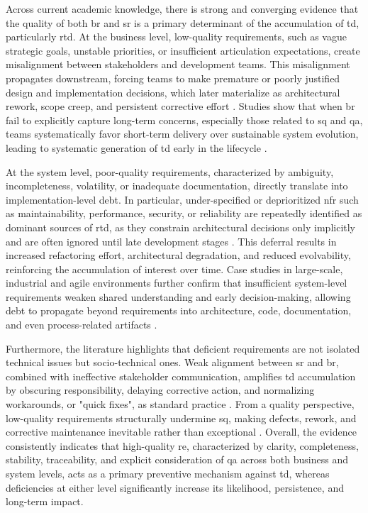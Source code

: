 \documentclass[12pt,reqno, twoside]{amsbook}
\theoremstyle{plain}
\numberwithin{equation}{chapter}
\numberwithin{section}{chapter}
\begin{document}
Across current academic knowledge, there is strong and converging evidence that the quality of both \gls{br} and \gls{sr}
is a primary determinant of the accumulation of \gls{td}, particularly \gls{rtd}. At the business level, low-quality requirements,
such as vague strategic goals, unstable priorities, or insufficient articulation expectations, create misalignment between stakeholders 
and development teams. This misalignment propagates downstream, forcing teams to make premature or poorly justified design and 
implementation decisions, which later materialize as architectural rework, scope creep, and persistent corrective effort \parencite{Rios2019,Besker2019}. 
Studies show that when \gls{br} fail to explicitly capture long-term concerns, especially those related to \gls{sq} and \gls{qa}, 
teams systematically favor short-term delivery over sustainable system evolution, leading to systematic generation of \gls{td} early 
in the lifecycle \parencite{Freire2020}.

At the system level, poor-quality requirements, characterized by ambiguity, incompleteness, volatility, or inadequate documentation,
directly translate into implementation-level debt. In particular, under-specified or deprioritized \gls{nfr} such as maintainability, 
performance, security, or reliability are repeatedly identified as dominant sources of \gls{rtd}, as they constrain architectural 
decisions only implicitly and are often ignored until late development stages \parencite{Melo2022,Rios2019}. This deferral results in 
increased refactoring effort, architectural degradation, and reduced evolvability, reinforcing the accumulation of interest over time. 
Case studies in large-scale, industrial and agile environments further confirm that insufficient system-level requirements weaken 
shared understanding and early decision-making, allowing debt to propagate beyond requirements into architecture, code, documentation, 
and even process-related artifacts \parencite{Besker2019,Rios2019}.

Furthermore, the literature highlights that deficient requirements are not isolated technical issues but socio-technical ones. 
Weak alignment between \gls{sr} and \gls{br}, combined with ineffective stakeholder communication, amplifies \gls{td} accumulation 
by obscuring responsibility, delaying corrective action, and normalizing workarounds, or "quick fixes", as standard practice 
\parencite{Klotins2018}. From a quality perspective, low-quality requirements structurally undermine \gls{sq}, making defects, rework, 
and corrective maintenance inevitable rather than exceptional \parencite{Femmer2019}. Overall, the evidence consistently indicates 
that high-quality \gls{re}, characterized by clarity, completeness, stability, traceability, and explicit consideration of \gls{qa} 
across both business and system levels, acts as a primary preventive mechanism against \gls{td}, whereas deficiencies at either level 
significantly increase its likelihood, persistence, and long-term impact.
\end{document}
